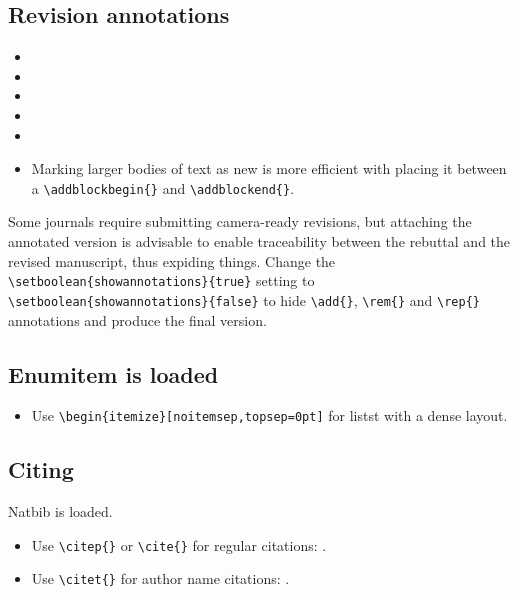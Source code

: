 \documentclass{article}
\begin{document}
\subsection{Revision annotations}

\begin{itemize}
    \item {}
    \item {}
    \item {}
    \item {}
    \item {}
    \item \addblockbegin{} Marking larger bodies of text as new is more efficient with placing it between a \texttt{\textbackslash addblockbegin\{\}} and \texttt{\textbackslash addblockend\{\}}. \addblockend{}
    
\end{itemize}

Some journals require submitting camera-ready revisions, but attaching the annotated version is advisable to enable traceability between the rebuttal and the revised manuscript, thus expiding things. Change the \verb|\setboolean{showannotations}{true}| setting to \verb|\setboolean{showannotations}{false}| to hide \verb|\add{}|, \verb|\rem{}| and \verb|\rep{}| annotations and produce the final version.


\subsection{Enumitem is loaded}

\begin{itemize}[noitemsep,topsep=0pt]
    \item Use \verb|\begin{itemize}[noitemsep,topsep=0pt]| for listst with a dense layout.
\end{itemize}

\subsection{Citing}

Natbib is loaded.
\begin{itemize}
    \item Use \verb|\citep{}| or \verb|\cite{}| for regular citations: \cite{bostrom2003are}.
    \item Use \verb|\citet{}| for author name citations: \citet{bostrom2003are}.
\end{itemize}



\end{document}
